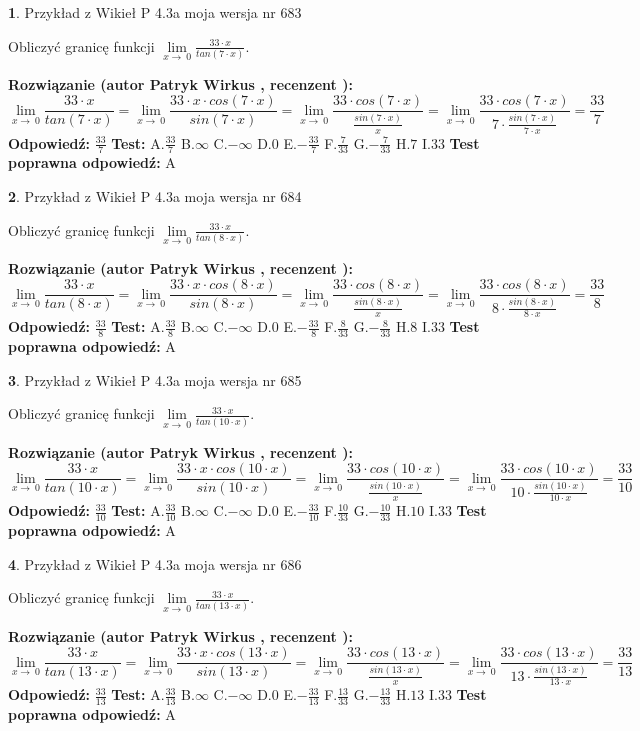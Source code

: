 \documentclass[12pt, a4paper]{article}
\theoremstyle{definition} %
\newtheorem{zad}{}
\newcommand{\zadStart}[1]{\begin{zad}#1\newline}
\newcommand{\zadStop}{\end{zad}}
\newcommand{\rozwStart}[2]{\noindent \textbf{Rozwiązanie (autor #1 , recenzent #2): }\newline}
\newcommand{\rozwStop}{\newline}
\newcommand{\odpStart}{\noindent \textbf{Odpowiedź:}\newline}
\newcommand{\odpStop}{\newline}
\newcommand{\testStart}{\noindent \textbf{Test:}\newline}
\newcommand{\testStop}{\newline}
\newcommand{\kluczStart}{\noindent \textbf{Test poprawna odpowiedź:}\newline}
\newcommand{\kluczStop}{\newline}
\begin{document}
\zadStart{Przykład z Wikieł P 4.3a moja wersja nr 683}


Obliczyć granicę funkcji $\lim\limits_{x\to\ 0}\frac{33 \cdot x}{tan(7 \cdot x)}$.
\zadStop
\rozwStart{Patryk Wirkus}{}
$$\lim\limits_{x\to\ 0}\frac{33 \cdot x}{tan(7 \cdot x)}=\lim\limits_{x\to\ 0}\frac{33 \cdot x \cdot cos(7 \cdot x)}{sin(7 \cdot x)}=\lim\limits_{x\to\ 0}\frac{33 \cdot cos(7 \cdot x)}{\frac{sin(7 \cdot x)}{x}}=\lim\limits_{x\to\ 0}\frac{33 \cdot cos(7 \cdot x)}{7 \cdot \frac{sin(7 \cdot x)}{7 \cdot x}} = \frac{33}{7}$$
\rozwStop
\odpStart
$\frac{33}{7}$
\odpStop
\testStart
A.$\frac{33}{7}$
B.$\infty$
C.$-\infty$
D.$0$
E.$-\frac{33}{7}$
F.$\frac{7}{33}$
G.$-\frac{7}{33}$
H.$7$
I.$33$
\testStop
\kluczStart
A
\kluczStop



\zadStart{Przykład z Wikieł P 4.3a moja wersja nr 684}


Obliczyć granicę funkcji $\lim\limits_{x\to\ 0}\frac{33 \cdot x}{tan(8 \cdot x)}$.
\zadStop
\rozwStart{Patryk Wirkus}{}
$$\lim\limits_{x\to\ 0}\frac{33 \cdot x}{tan(8 \cdot x)}=\lim\limits_{x\to\ 0}\frac{33 \cdot x \cdot cos(8 \cdot x)}{sin(8 \cdot x)}=\lim\limits_{x\to\ 0}\frac{33 \cdot cos(8 \cdot x)}{\frac{sin(8 \cdot x)}{x}}=\lim\limits_{x\to\ 0}\frac{33 \cdot cos(8 \cdot x)}{8 \cdot \frac{sin(8 \cdot x)}{8 \cdot x}} = \frac{33}{8}$$
\rozwStop
\odpStart
$\frac{33}{8}$
\odpStop
\testStart
A.$\frac{33}{8}$
B.$\infty$
C.$-\infty$
D.$0$
E.$-\frac{33}{8}$
F.$\frac{8}{33}$
G.$-\frac{8}{33}$
H.$8$
I.$33$
\testStop
\kluczStart
A
\kluczStop



\zadStart{Przykład z Wikieł P 4.3a moja wersja nr 685}


Obliczyć granicę funkcji $\lim\limits_{x\to\ 0}\frac{33 \cdot x}{tan(10 \cdot x)}$.
\zadStop
\rozwStart{Patryk Wirkus}{}
$$\lim\limits_{x\to\ 0}\frac{33 \cdot x}{tan(10 \cdot x)}=\lim\limits_{x\to\ 0}\frac{33 \cdot x \cdot cos(10 \cdot x)}{sin(10 \cdot x)}=\lim\limits_{x\to\ 0}\frac{33 \cdot cos(10 \cdot x)}{\frac{sin(10 \cdot x)}{x}}=\lim\limits_{x\to\ 0}\frac{33 \cdot cos(10 \cdot x)}{10 \cdot \frac{sin(10 \cdot x)}{10 \cdot x}} = \frac{33}{10}$$
\rozwStop
\odpStart
$\frac{33}{10}$
\odpStop
\testStart
A.$\frac{33}{10}$
B.$\infty$
C.$-\infty$
D.$0$
E.$-\frac{33}{10}$
F.$\frac{10}{33}$
G.$-\frac{10}{33}$
H.$10$
I.$33$
\testStop
\kluczStart
A
\kluczStop



\zadStart{Przykład z Wikieł P 4.3a moja wersja nr 686}


Obliczyć granicę funkcji $\lim\limits_{x\to\ 0}\frac{33 \cdot x}{tan(13 \cdot x)}$.
\zadStop
\rozwStart{Patryk Wirkus}{}
$$\lim\limits_{x\to\ 0}\frac{33 \cdot x}{tan(13 \cdot x)}=\lim\limits_{x\to\ 0}\frac{33 \cdot x \cdot cos(13 \cdot x)}{sin(13 \cdot x)}=\lim\limits_{x\to\ 0}\frac{33 \cdot cos(13 \cdot x)}{\frac{sin(13 \cdot x)}{x}}=\lim\limits_{x\to\ 0}\frac{33 \cdot cos(13 \cdot x)}{13 \cdot \frac{sin(13 \cdot x)}{13 \cdot x}} = \frac{33}{13}$$
\rozwStop
\odpStart
$\frac{33}{13}$
\odpStop
\testStart
A.$\frac{33}{13}$
B.$\infty$
C.$-\infty$
D.$0$
E.$-\frac{33}{13}$
F.$\frac{13}{33}$
G.$-\frac{13}{33}$
H.$13$
I.$33$
\testStop
\kluczStart
A
\kluczStop
\end{document}

